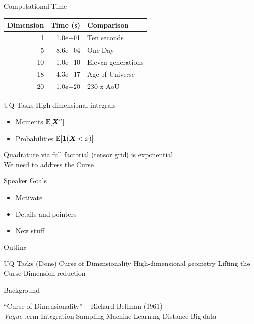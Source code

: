 \documentclass[14pt]{beamer}
\begin{document}
\begin{frame}{Computational Time}
  \begin{table}
    \begin{tabular}{r|r|l}
    \hline
    Dimension & Time (s) & Comparison\\
    \hline
    1 & 1.0e+01 & Ten seconds\\
    \hline
    5 & 8.6e+04 & One Day\\
    \hline
    10 & 1.0e+10 & Eleven generations\\
    \hline
    18 & 4.3e+17 & Age of Universe\\
    \hline
    20 & 1.0e+20 & 230 x AoU\\
    \hline
    \end{tabular}
  \end{table}
\end{frame}

\begin{frame}{UQ Tasks}
  High-dimensional integrals
  \begin{itemize}
  \item Moments $\mathbb{E}[\boldsymbol{X}^n]$
  \item Probabilities $\E[\i1(\mX<x)]$
  \end{itemize}

  \bigskip Quadrature via full factorial (tensor grid) is exponential \\
  We need to address the Curse
\end{frame}

\begin{frame}{Speaker Goals}
  \begin{itemize}
  \item Motivate
  \item Details and pointers
  \item New stuff
  \end{itemize}
\end{frame}

\begin{frame}{Outline}
  \begin{outline}
  \1 UQ Tasks (Done)
  \1 Curse of Dimensionality
    \2 High-dimensional geometry
  \1 Lifting the Curse
    \2 Dimension reduction
  \end{outline}
\end{frame}

\begin{frame}{Background}
  \begin{outline}
  \1 ``Curse of Dimensionality'' -- Richard Bellman (1961) \\
  \1 \emph{Vague} term
    \2 Integration
    \2 Sampling
    \2 Machine Learning
    \2 Distance
    \2 Big data
  \end{outline}
\end{frame}
\end{document}
